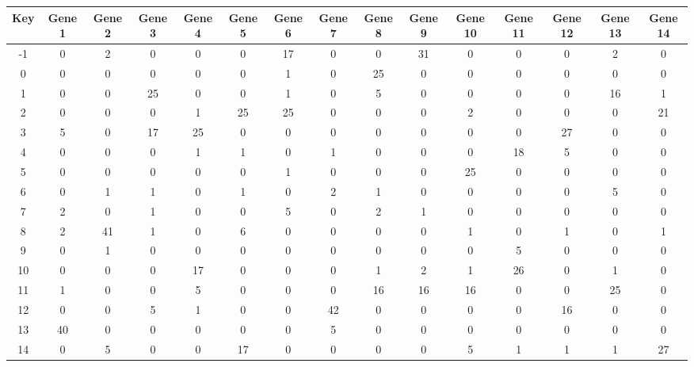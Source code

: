 \begin{tabular}{|c|c|c|c|c|c|c|c|c|c|c|c|c|c|c|}
\hline
Key & Gene 1 & Gene 2 & Gene 3 & Gene 4 & Gene 5 & Gene 6 & Gene 7 & Gene 8 & Gene 9 & Gene 10 & Gene 11 & Gene 12 & Gene 13 & Gene 14 \\
\hline
-1 & 0 & 2 & 0 & 0 & 0 & 17 & 0 & 0 & 31 & 0 & 0 & 0 & 2 & 0 \\
0 & 0 & 0 & 0 & 0 & 0 & 1 & 0 & 25 & 0 & 0 & 0 & 0 & 0 & 0 \\
1 & 0 & 0 & 25 & 0 & 0 & 1 & 0 & 5 & 0 & 0 & 0 & 0 & 16 & 1 \\
2 & 0 & 0 & 0 & 1 & 25 & 25 & 0 & 0 & 0 & 2 & 0 & 0 & 0 & 21 \\
3 & 5 & 0 & 17 & 25 & 0 & 0 & 0 & 0 & 0 & 0 & 0 & 27 & 0 & 0 \\
4 & 0 & 0 & 0 & 1 & 1 & 0 & 1 & 0 & 0 & 0 & 18 & 5 & 0 & 0 \\
5 & 0 & 0 & 0 & 0 & 0 & 1 & 0 & 0 & 0 & 25 & 0 & 0 & 0 & 0 \\
6 & 0 & 1 & 1 & 0 & 1 & 0 & 2 & 1 & 0 & 0 & 0 & 0 & 5 & 0 \\
7 & 2 & 0 & 1 & 0 & 0 & 5 & 0 & 2 & 1 & 0 & 0 & 0 & 0 & 0 \\
8 & 2 & 41 & 1 & 0 & 6 & 0 & 0 & 0 & 0 & 1 & 0 & 1 & 0 & 1 \\
9 & 0 & 1 & 0 & 0 & 0 & 0 & 0 & 0 & 0 & 0 & 5 & 0 & 0 & 0 \\
10 & 0 & 0 & 0 & 17 & 0 & 0 & 0 & 1 & 2 & 1 & 26 & 0 & 1 & 0 \\
11 & 1 & 0 & 0 & 5 & 0 & 0 & 0 & 16 & 16 & 16 & 0 & 0 & 25 & 0 \\
12 & 0 & 0 & 5 & 1 & 0 & 0 & 42 & 0 & 0 & 0 & 0 & 16 & 0 & 0 \\
13 & 40 & 0 & 0 & 0 & 0 & 0 & 5 & 0 & 0 & 0 & 0 & 0 & 0 & 0 \\
14 & 0 & 5 & 0 & 0 & 17 & 0 & 0 & 0 & 0 & 5 & 1 & 1 & 1 & 27 \\
\hline
\end{tabular}